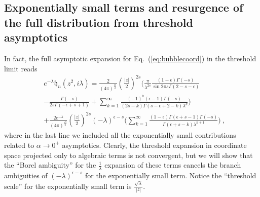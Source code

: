\documentclass[a4paper,11pt]{article}
\begin{document}
\subsection{Exponentially small terms and resurgence of the full distribution from threshold asymptotics}\label{sec:resurgent}
In fact, the full asymptotic expansion for Eq.~(\ref{eq:bubblecoord}) in the threshold limit reads
\begin{align}\label{eq:fullasympthre}
&e^{-\lambda}\mathfrak{h}_n(z^2,i\lambda)=\frac{ 2}{(4\pi)^{\frac{D}{2}}}\left(\frac{|z|}{2}\right)^{2s}\bigg(\frac{\pi}{\lambda^{2s}}\frac{(1-\epsilon)\Gamma(-s)}{\sin 2\pi s \Gamma(2-s-\epsilon)} \nonumber \\ 
&-\frac{\Gamma (-s)}{2s \Gamma (-\epsilon+s+1)}+\sum_{k=1}^{\infty}\frac{(-1)^k(\epsilon-1)\Gamma(-s)}{(2s-k)\Gamma(s-\epsilon+2-k)\lambda^{k}}\bigg) \nonumber \\ 
&+\frac{ 2e^{-\lambda}}{(4\pi)^{\frac{D}{2}}}\left(\frac{|z|}{2}\right)^{2s}(-\lambda)^{\epsilon-s}\bigg(\sum_{k=1}^{\infty}\frac{(1-\epsilon
)\Gamma(\epsilon+s-1)\Gamma(-s)}{\Gamma(\epsilon+s-k)\lambda^{k+1}}\bigg) \ ,
\end{align}
where in the last line we included all the exponentially small contributions related to $\alpha \rightarrow 0^+$ asymptotics.  Clearly, the threshold expansion in coordinate space projected only to algebraic terms is not convergent, but we will show that the ``Borel ambiguity'' for the $\frac{1}{\lambda}$ expansion of these terms cancels the branch ambiguities of $(-\lambda)^{\epsilon-s}$ for the exponentially small term. Notice the ``threshold scale'' for the exponentially small term is $\frac{\sqrt{\lambda}}{|z|}$. 
\end{document}

